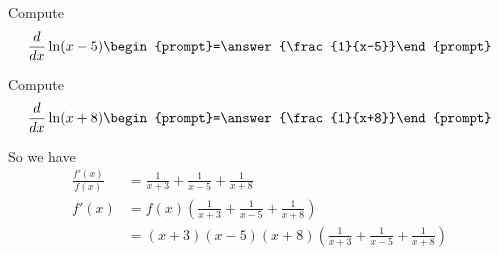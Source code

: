 \documentclass{ximera}
\begin{document}
\begin{problem}
  Compute %
  \[
  \ddx \ln(x-5)  \begin{prompt}=\answer{\frac{1}{x-5}}\end{prompt}
  \]
\end{problem}

\begin{problem}
  Compute %
  \[
  \ddx \ln(x+8)  \begin{prompt}=\answer{\frac{1}{x+8}}\end{prompt}
  \]
\end{problem}

So we have
\begin{align*}
  \frac{f'(x)}{f(x)} &= \frac{1}{x+3} + \frac{1}{x-5} + \frac{1}{x+8} \\
  f'(x) &= f(x) \left(\frac{1}{x+3} + \frac{1}{x-5} + \frac{1}{x+8}\right)\\
  &= (x+3)(x-5)(x+8)  \left(\frac{1}{x+3} + \frac{1}{x-5} + \frac{1}{x+8}\right)
\end{align*}



%
\end{document}
